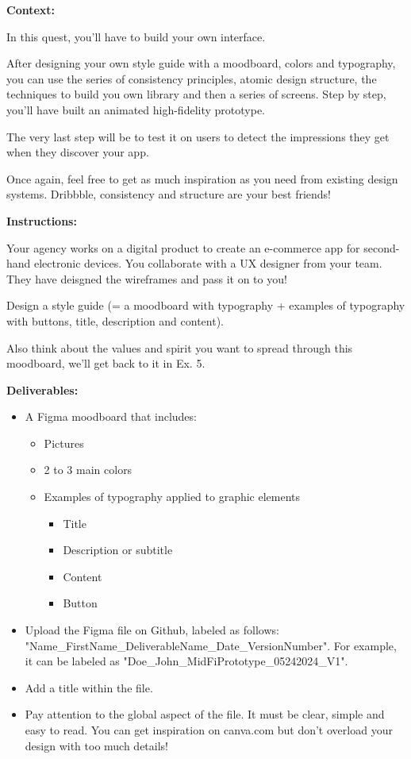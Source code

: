 \makeheaderfiles

\textbf{Context:}

In this quest, you'll have to build your own interface.

After designing your own style guide with a moodboard, colors and typography, you can use the series of consistency principles, atomic design structure, the techniques to build you own library and then a series of screens. Step by step, you'll have built an animated high-fidelity prototype.

The very last step will be to test it on users to detect the impressions they get when they discover your app.

Once again, feel free to get as much inspiration as you need from existing design systems. Dribbble, consistency and structure are your best friends!

\textbf{Instructions:}

Your agency works on a digital product to create an e-commerce app for second-hand electronic devices. You collaborate with a UX designer from your team. They have deisgned the wireframes and pass it on to you!

Design a style guide (= a moodboard with typography + examples of typography with buttons, title, description and content).

Also think about the values and spirit you want to spread through this moodboard, we'll get back to it in Ex. 5.

\textbf{Deliverables:}

\begin{itemize}
\item A Figma moodboard that includes:
\begin{itemize}
\item Pictures
\item 2 to 3 main colors
\item Examples of typography applied to graphic elements
\begin{itemize}
\item Title
\item Description or subtitle
\item Content
\item Button
\end{itemize}
\end{itemize}
\item Upload the Figma file on Github, labeled as follows: "Name\_FirstName\_DeliverableName\_Date\_VersionNumber". For example, it can be labeled as "Doe\_John\_MidFiPrototype\_05242024\_V1".
\item Add a title within the file.
\item Pay attention to the global aspect of the file. It must be clear, simple and easy to read. You can get inspiration on canva.com but don't overload your design with too much details!
\end{itemize}

